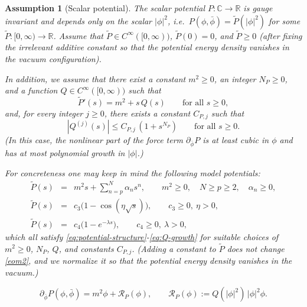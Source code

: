 \documentclass[10pt,a4paper]{amsart}
\newtheorem{assumption}{Assumption}
\begin{document}
\begin{assumption}[Scalar potential]\label{asumsiP}
The scalar potential $P:\mathbb{C}\to\mathbb{R}$ is gauge invariant and depends only on the scalar $|\phi|^{2}$, i.e.\ $P(\phi,\bar\phi)=\widetilde P(|\phi|^{2})$ for some $\widetilde P:[0,\infty)\to\mathbb{R}$.
Assume that $\widetilde P\in C^\infty([0,\infty))$, $\widetilde P(0)=0$, and $\widetilde P\ge 0$ (after fixing the irrelevant additive constant so that the potential energy density vanishes in the vacuum configuration).

In addition, we assume that there exist a constant $m^{2}\ge 0$, an integer $N_{P}\ge 0$, and a function $Q\in C^\infty([0,\infty))$ such that
\begin{equation}\label{eq:potential-structure}
\widetilde P'(s)=m^{2}+s\,Q(s)\qquad\text{for all }s\ge 0,
\end{equation}
and, for every integer $j\ge0$, there exists a constant $C_{P,j}$ such that
\begin{equation}\label{eq:Q-growth}
|Q^{(j)}(s)|\le C_{P,j}\,(1+s^{N_{P}})\qquad\text{for all }s\ge 0.
\end{equation}
(In this case, the nonlinear part of the force term $\partial_{\bar\phi}P$ is at least cubic in $\phi$ and has at most polynomial growth in $|\phi|$.)

For concreteness one may keep in mind the following model potentials:
\begin{eqnarray}
\widetilde P(s)
&=&
m^2s+\sum_{n=p}^{N}\alpha_{n}s^{n},
\qquad m^2\ge0,\quad N\ge p\ge2,\quad \alpha_n\ge 0,
\label{V4}
\\
\widetilde P(s)
&=&
c_{3}\bigl(1-\cos(\eta\sqrt{s})\bigr),
\qquad c_3\ge 0,\ \eta>0,
\label{sine}
\\
\widetilde P(s)
&=&
c_{4}\bigl(1-e^{-\lambda s}\bigr),
\qquad c_4\ge 0,\ \lambda>0,
\label{toda}
\end{eqnarray}
which all satisfy \eqref{eq:potential-structure}-\eqref{eq:Q-growth} for suitable choices of $m^{2}\ge0$, $N_{P}$, $Q$, and constants $C_{P,j}$.
(Adding a constant to $\widetilde P$ does not change \eqref{eom2}, and we normalize it so that the potential energy density vanishes in the vacuum.)
\end{assumption}

\begin{equation}\label{eq:potential-remainder}
\partial_{\bar\phi}P(\phi,\bar\phi)=m^{2}\phi+\mathcal R_{P}(\phi),
\qquad
\mathcal R_{P}(\phi):=Q(|\phi|^{2})\,|\phi|^{2}\phi.
\end{equation}
\end{document}

